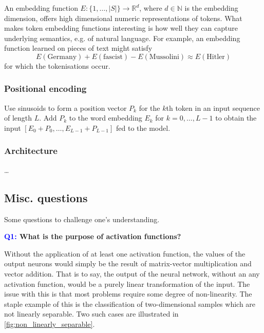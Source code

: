\documentclass[11pt]{article}
\begin{document}
An embedding function $E:\{1,\dots,|S|\}\to\mathbb{R}^d$, where $d\in\mathbb{N}$ is the embedding dimension, offers high dimensional numeric representations of tokens. What makes token embedding functions interesting is how well they can capture underlying semantics, e.g. of natural language. For example, an embedding function learned on pieces of text might satisfy
$$
E(\text{Germany})+E(\text{fascist})-E(\text{Mussolini})
\approx
E(\text{Hitler})
$$
for which the tokenisations occur.

\subsubsection{Positional encoding}
Use sinusoids to form a position vector $P_k$ for the $k$th token in an input sequence of length $L$. Add $P_k$ to the word embedding $E_k$ for $k=0,\dots,L-1$ to obtain the input $[E_0+P_0,\dots,E_{L-1}+P_{L-1}]$ fed to the model.

\subsubsection{Architecture}
\dots

\subsection{Misc. questions}

Some questions to challenge one's understanding.

\begin{center}
    \textbf{\textcolor{blue}{Q1:} What is the purpose of activation functions?}
\end{center}
Without the application of at least one activation function, the values of the output neurons would simply be the result of matrix-vector multiplication and vector addition. That is to say, the output of the neural network, without an any activation function, would be a purely linear transformation of the input. The issue with this is that most problems require some degree of non-linearity. The staple example of this is the classification of two-dimensional samples which are not linearly separable. Two such cases are illustrated in \autoref{fig:non_linearly_separable}.
\end{document}
